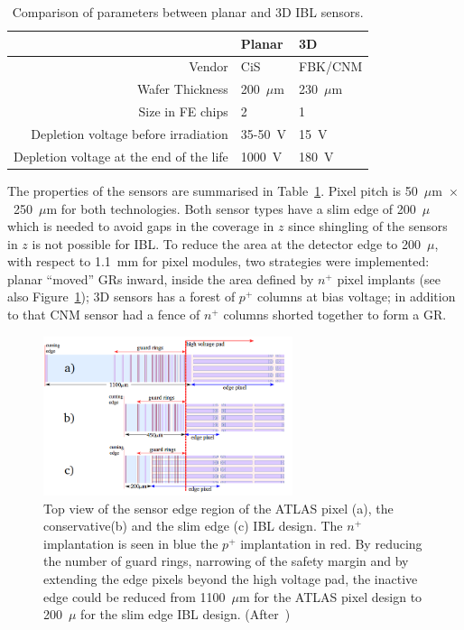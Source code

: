 \begin{table}[!htpb]
\caption{\label{tab:IBLsensors}Comparison of parameters between planar and 3D IBL sensors.}
\centering
\begin{tabular}{|r|l|l|}
\hline
 & Planar & 3D\\
 \hline
 \hline
 Vendor & CiS & FBK/CNM \\
 Wafer Thickness & 200~$\mu$m & 230~$\mu$m \\
 Size in FE chips & 2 & 1\\
 Depletion voltage before irradiation & 35-50~V & 15~V \\
 Depletion voltage at the end of the life & 1000~V & 180~V\\
 \hline
 \end{tabular}
\end{table}
The properties of the sensors are summarised in Table~\ref{tab:IBLsensors}.
Pixel pitch is 50~$\mu$m~$\times$~250~$\mu$m for both technologies. 
Both sensor types have a slim edge of 200~$\mu$ which is needed to avoid gaps in the coverage in $z$ since shingling of the sensors in $z$ is not possible for IBL. 
To reduce the area at the detector edge to 200~$\mu$, with respect to 1.1~mm for pixel modules, 
two strategies were implemented: planar ``moved'' GRs inward, inside the area defined by $n^+$ 
pixel implants (see also Figure~\ref{fig:IBLSlimEdge});  3D sensors has a forest of $p^+$ columns 
at bias voltage; in addition to that CNM sensor had a fence of $n^+$ columns shorted together to form a GR.
\begin{figure}[!htpb]
\centering
\includegraphics[width=0.65\textwidth]{IBLSlimEdge.png}
\caption{\label{fig:IBLSlimEdge}Top view of the sensor edge region of the ATLAS pixel (a), the conservative(b) and the slim edge (c) IBL design. The $n^+$ implantation is seen in blue the $p^+$ implantation in red. By reducing the number of guard rings, narrowing of the safety margin and by extending the edge pixels beyond the high voltage pad, the inactive edge could be reduced from 1100~$\mu$m for the ATLAS pixel design to 200~$\mu$ for the slim edge IBL design. (After~\cite{WittigPHD})} 
\end{figure}

